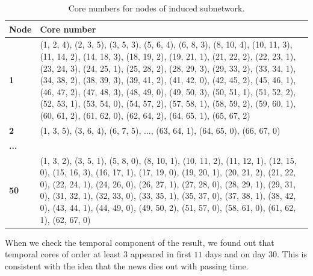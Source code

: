 \documentclass[a4paper,twoside,10pt]{article}
\begin{document}
\pagebreak
\begin{center}
\begin{longtable}{p{}p{}}
\caption{Core numbers for nodes of induced subnetwork.}
\label{reuterscore}\\
\textbf{Node} & \textbf{Core number} \\
\endhead
\textbf{1} & (1, 2, 4), (2, 3, 5), (3, 5, 3), (5, 6, 4), (6, 8, 3), (8, 10, 4), 
     (10, 11, 3), (11, 14, 2), (14, 18, 3), (18, 19, 2), (19, 21, 1), 
     (21, 22, 2), (22, 23, 1), (23, 24, 3), (24, 25, 1), (25, 28, 2), 
     (28, 29, 3), (29, 33, 2), (33, 34, 1), (34, 38, 2), (38, 39, 3), 
     (39, 41, 2), (41, 42, 0), (42, 45, 2), (45, 46, 1), (46, 47, 2), 
     (47, 48, 3), (48, 49, 0), (49, 50, 3), (50, 51, 1), (51, 52, 2), 
     (52, 53, 1), (53, 54, 0), (54, 57, 2), (57, 58, 1), (58, 59, 2), 
     (59, 60, 1), (60, 61, 2), (61, 62, 0), (62, 64, 2), (64, 65, 1), 
     (65, 67, 2) \\
\textbf{2} & (1, 3, 5), (3, 6, 4), (6, 7, 5), ..., (63, 64, 1), (64, 65, 0), (66, 67, 0) \\
\textbf{...} & \\
\textbf{50} & (1, 3, 2), (3, 5, 1), (5, 8, 0), (8, 10, 1), (10, 11, 2), (11, 12, 1),
     (12, 15, 0), (15, 16, 3), (16, 17, 1), (17, 19, 0), (19, 20, 1), 
     (20, 21, 2), (21, 22, 0), (22, 24, 1), (24, 26, 0), (26, 27, 1), 
     (27, 28, 0), (28, 29, 1), (29, 31, 0), (31, 32, 1), (32, 33, 0), 
     (33, 35, 1), (35, 37, 0), (37, 38, 1), (38, 42, 0), (43, 44, 1), 
     (44, 49, 0), (49, 50, 2), (51, 57, 0), (58, 61, 0), (61, 62, 1), 
     (62, 67, 0)
\end{longtable}
\end{center}

When we check the temporal component of the result, we found out that temporal cores of order at least $3$ appeared in first $11$ days and on day $30$. This is consistent with the idea that the news dies out with passing time.
\end{document}
